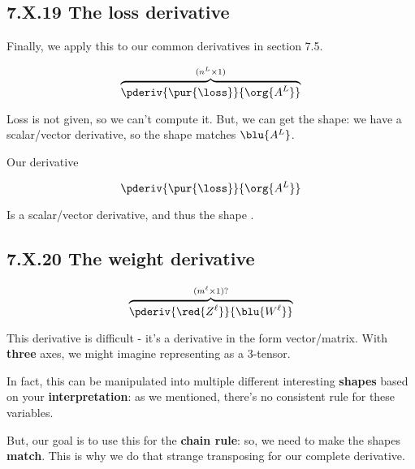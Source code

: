     \subsection*{7.X.19 \quad The loss derivative}
    
        Finally, we apply this to our common derivatives in section 7.5.
        
        \begin{equation}
            \overbrace{
                \pderiv {\pur{\loss}}{\org{A^L}}
            }^{(n^{L} \times 1)}
        \end{equation}
        
        Loss is not given, so we can't compute it. But, we can get the shape: we have a scalar/vector derivative, so the shape matches $\blu{A^L}$.\\
        
        \begin{notation}
            Our derivative
            
            \begin{equation}
                \pderiv {\pur{\loss}}{\org{A^L}}
            \end{equation}
        
            Is a scalar/vector derivative, and thus the shape .
        \end{notation}
            
    \secdiv
            
    \subsection*{7.X.20 \quad The weight derivative}
        
        \begin{equation}
            \overbrace{
                \pderiv {\red{Z^\ell}}   {\blu{W^{\ell}}} 
            }^{ (m^{\ell} \times 1) ?}
        \end{equation}
        
        This derivative is difficult - it's a derivative in the form vector/matrix. With \textbf{three} axes, we might imagine representing as a 3-tensor.
        
        In fact, this can be manipulated into multiple different interesting \textbf{shapes} based on your \textbf{interpretation}: as we mentioned, there's no consistent rule for these variables.
            
        But, our goal is to use this for the \textbf{chain rule}: so, we need to make the shapes \textbf{match}. This is why we do that strange transposing for our complete derivative.
        
